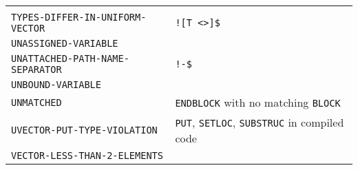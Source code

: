\documentclass[a4paper]{scrbook}
\begin{document}
\begin{longtable}[]{@{}ll@{}}
\begin{minipage}[t]{0.36\columnwidth}
\end{minipage}\tabularnewline
\begin{minipage}[t]{0.58\columnwidth}\raggedright\strut
\texttt{TYPES-DIFFER-IN-UNIFORM-VECTOR}\strut
\end{minipage} & \begin{minipage}[t]{0.36\columnwidth}\raggedright\strut
\texttt{!{[}T\ \textless{}\textgreater{}{]}\$}\strut
\end{minipage}\tabularnewline
\begin{minipage}[t]{0.58\columnwidth}\raggedright\strut
\texttt{UNASSIGNED-VARIABLE}\strut
\end{minipage} & \begin{minipage}[t]{0.36\columnwidth}\raggedright\strut
\strut
\end{minipage}\tabularnewline
\begin{minipage}[t]{0.58\columnwidth}\raggedright\strut
\texttt{UNATTACHED-PATH-NAME-SEPARATOR}\strut
\end{minipage} & \begin{minipage}[t]{0.36\columnwidth}\raggedright\strut
\texttt{!-\$}\strut
\end{minipage}\tabularnewline
\begin{minipage}[t]{0.58\columnwidth}\raggedright\strut
\texttt{UNBOUND-VARIABLE}\strut
\end{minipage} & \begin{minipage}[t]{0.36\columnwidth}\raggedright\strut
\strut
\end{minipage}\tabularnewline
\begin{minipage}[t]{0.58\columnwidth}\raggedright\strut
\texttt{UNMATCHED}\strut
\end{minipage} & \begin{minipage}[t]{0.36\columnwidth}\raggedright\strut
\texttt{ENDBLOCK} with no matching \texttt{BLOCK}\strut
\end{minipage}\tabularnewline
\begin{minipage}[t]{0.58\columnwidth}\raggedright\strut
\texttt{UVECTOR-PUT-TYPE-VIOLATION}\strut
\end{minipage} & \begin{minipage}[t]{0.36\columnwidth}\raggedright\strut
\texttt{PUT}, \texttt{SETLOC}, \texttt{SUBSTRUC} in compiled code\strut
\end{minipage}\tabularnewline
\begin{minipage}[t]{0.58\columnwidth}\raggedright\strut
\texttt{VECTOR-LESS-THAN-2-ELEMENTS}\strut
\end{minipage} & \begin{minipage}[t]{0.36\columnwidth}\raggedright\strut

\end{minipage}
\end{longtable}
\end{document}
